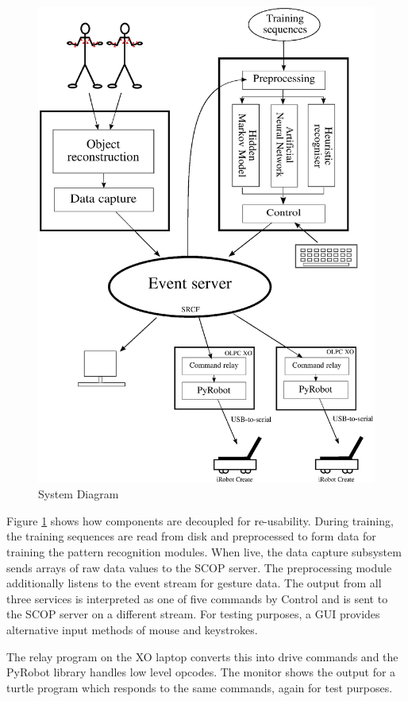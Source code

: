 \documentclass[12pt,a4,notitlepage]{report}
\renewcommand{\_}{\texttt{\symbol{95}}}
\newcommand{\<}{\texttt{\symbol{60}}}
\renewcommand{\>}{\texttt{\symbol{62}}}
\begin{document}
\begin{figure}
\centering
\includegraphics[scale=0.6,angle=0]{diagrams/systemdiagram.ps}
\caption{System Diagram}
\label{sysdiag}
\end{figure}

Figure \ref{sysdiag} shows how components are decoupled for re-usability. During training, the training sequences are read from disk and preprocessed to form data for training the pattern recognition modules. When live, the data capture subsystem sends arrays of raw data values to the SCOP server. The preprocessing module additionally listens to the event stream for gesture data. The output from all three services is interpreted as one of five commands by Control and is sent to the SCOP server on a different stream. For testing purposes, a GUI provides alternative input methods of mouse and keystrokes.

The relay program on the XO laptop converts this into drive commands and the PyRobot library handles low level opcodes. The monitor shows the output for a turtle program which responds to the same commands, again for test purposes.
\end{document}
